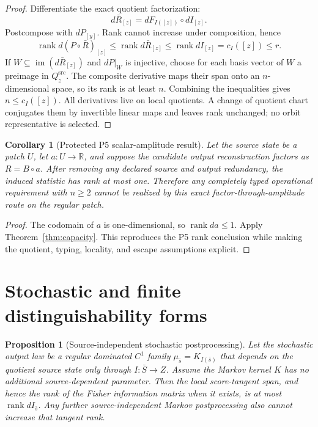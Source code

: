 \documentclass[11pt]{article}
\newtheorem{proposition}{Proposition}
\newtheorem{corollary}{Corollary}
\newcommand{\R}{\mathbb{R}}
\newcommand{\rank}{\operatorname{rank}}
\newcommand{\im}{\operatorname{im}}
\newcommand{\QS}{Q^{\mathrm{src}}}
\begin{document}
\begin{proof}
Differentiate the exact quotient factorization:
\[
 d\bar R_{[z]}=dF_{I([z])}\circ dI_{[z]} .
\]
Postcompose with \(dP_{[y]}\).  Rank cannot increase under composition, hence
\[
 \rank d(P\circ\bar R)_{[z]}
 \leq\rank d\bar R_{[z]}
 \leq\rank dI_{[z]}=c_I([z])\leq r .
\]
If \(W\subseteq\im(d\bar R_{[z]})\) and \(dP|_W\) is injective, choose for each
basis vector of \(W\) a preimage in \(\QS_z\).  The composite derivative maps
their span onto an \(n\)-dimensional space, so its rank is at least \(n\).
Combining the inequalities gives \(n\leq c_I([z])\).  All derivatives live on
local quotients.  A change of quotient chart conjugates them by invertible
linear maps and leaves rank unchanged; no orbit representative is selected.
\end{proof}

\begin{corollary}[Protected P5 scalar-amplitude result]
\label{cor:p5}
Let the source state be a patch \(U\), let \(a:U\to\R\), and suppose the
candidate output reconstruction factors as \(R=B\circ a\).  After removing any
declared source and output redundancy, the induced statistic has rank at most
one.  Therefore any completely typed operational requirement with
\(n\geq2\) cannot be realized by this exact factor-through-amplitude route on
the regular patch.
\end{corollary}

\begin{proof}
The codomain of \(a\) is one-dimensional, so \(\rank da\leq1\).  Apply
Theorem~\ref{thm:capacity}.  This reproduces the P5 rank conclusion while
making the quotient, typing, locality, and escape assumptions explicit.
\end{proof}

\section{Stochastic and finite distinguishability forms}

\begin{proposition}[Source-independent stochastic postprocessing]
\label{prop:stochastic}
Let the stochastic output law be a regular dominated \(C^1\) family
\(\mu_{\bar s}=K_{I(\bar s)}\) that depends on the quotient source state only
through \(I:\bar S\to Z\).  Assume the Markov kernel \(K\) has no additional
source-dependent parameter.  Then the local score-tangent span, and hence the
rank of the Fisher information matrix when it exists, is at most
\(\rank dI_{\bar s}\).  Any further source-independent Markov postprocessing
also cannot increase that tangent rank.
\end{proposition}
\end{document}
